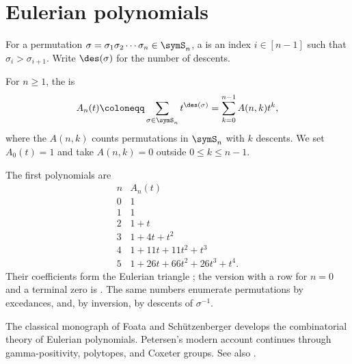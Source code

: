 



\section[eulerian]{Eulerian polynomials}

For a permutation $\sigma=\sigma_1\sigma_2\dotsb\sigma_n\in\symS_n$, a
 is an index $i\in[n-1]$ such that
$\sigma_i>\sigma_{i+1}$.  Write $\des(\sigma)$ for the number of descents.

\begin{definition}
\label{eulerianPolynomial}\label{eulerianPolynomialDefinition}
For $n\geq1$, the  is
\[
 A_n(t)\coloneqq\sum_{\sigma\in\symS_n}t^{\des(\sigma)}
 =\sum_{k=0}^{n-1}A(n,k)t^k,
\]
where the  $A(n,k)$ counts permutations in $\symS_n$
with $k$ descents.  We set $A_0(t)=1$ and take $A(n,k)=0$ outside
$0\leq k\leq n-1$.
\end{definition}

The first polynomials are
\[
\begin{array}{c|l}
n&A_n(t)\\
\hline
0&1\\
1&1\\
2&1+t\\
3&1+4t+t^2\\
4&1+11t+11t^2+t^3\\
5&1+26t+66t^2+26t^3+t^4.
\end{array}
\]
Their coefficients form the Eulerian triangle ; the version
with a row for $n=0$ and a terminal zero is .  The same numbers
enumerate permutations by excedances, and, by inversion, by descents of
$\sigma^{-1}$.

The classical monograph of Foata and Schützenberger
\cite{FoataSchutzenberger1970} develops the combinatorial theory of Eulerian
polynomials.  Petersen's modern account \cite{Petersen2015EulerianNumbers}
continues through gamma-positivity, polytopes, and Coxeter groups.  See also
\cite[Sec.~1.4]{StanleyEC1}.


